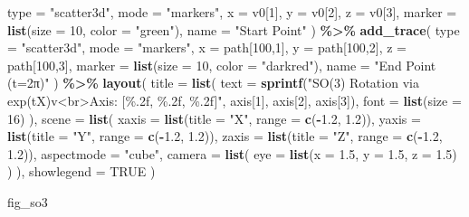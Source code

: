 \documentclass[
]{book}
\newenvironment{Shaded}{\begin{snugshade}}{\end{snugshade}}
\newcommand{\AttributeTok}[1]{\textcolor[rgb]{0.13,0.29,0.53}{#1}}
\newcommand{\ConstantTok}[1]{\textcolor[rgb]{0.56,0.35,0.01}{#1}}
\newcommand{\DecValTok}[1]{\textcolor[rgb]{0.00,0.00,0.81}{#1}}
\newcommand{\FloatTok}[1]{\textcolor[rgb]{0.00,0.00,0.81}{#1}}
\newcommand{\FunctionTok}[1]{\textcolor[rgb]{0.13,0.29,0.53}{\textbf{#1}}}
\newcommand{\NormalTok}[1]{#1}
\newcommand{\SpecialCharTok}[1]{\textcolor[rgb]{0.81,0.36,0.00}{\textbf{#1}}}
\newcommand{\StringTok}[1]{\textcolor[rgb]{0.31,0.60,0.02}{#1}}
\theoremstyle{definition}
\theoremstyle{definition}
\theoremstyle{definition}
\theoremstyle{definition}
\theoremstyle{remark}
\begin{document}
\begin{Shaded}
\begin{Highlighting}[]
    \AttributeTok{type =} \StringTok{"scatter3d"}\NormalTok{,}
    \AttributeTok{mode =} \StringTok{"markers"}\NormalTok{,}
    \AttributeTok{x =}\NormalTok{ v0[}\DecValTok{1}\NormalTok{], }\AttributeTok{y =}\NormalTok{ v0[}\DecValTok{2}\NormalTok{], }\AttributeTok{z =}\NormalTok{ v0[}\DecValTok{3}\NormalTok{],}
    \AttributeTok{marker =} \FunctionTok{list}\NormalTok{(}\AttributeTok{size =} \DecValTok{10}\NormalTok{, }\AttributeTok{color =} \StringTok{"green"}\NormalTok{),}
    \AttributeTok{name =} \StringTok{"Start Point"}
\NormalTok{  ) }\SpecialCharTok{\%\textgreater{}\%}
  \FunctionTok{add\_trace}\NormalTok{(}
    \AttributeTok{type =} \StringTok{"scatter3d"}\NormalTok{,}
    \AttributeTok{mode =} \StringTok{"markers"}\NormalTok{,}
    \AttributeTok{x =}\NormalTok{ path[}\DecValTok{100}\NormalTok{,}\DecValTok{1}\NormalTok{], }\AttributeTok{y =}\NormalTok{ path[}\DecValTok{100}\NormalTok{,}\DecValTok{2}\NormalTok{], }\AttributeTok{z =}\NormalTok{ path[}\DecValTok{100}\NormalTok{,}\DecValTok{3}\NormalTok{],}
    \AttributeTok{marker =} \FunctionTok{list}\NormalTok{(}\AttributeTok{size =} \DecValTok{10}\NormalTok{, }\AttributeTok{color =} \StringTok{"darkred"}\NormalTok{),}
    \AttributeTok{name =} \StringTok{"End Point (t=2π)"}
\NormalTok{  ) }\SpecialCharTok{\%\textgreater{}\%}
  \FunctionTok{layout}\NormalTok{(}
    \AttributeTok{title =} \FunctionTok{list}\NormalTok{(}
      \AttributeTok{text =} \FunctionTok{sprintf}\NormalTok{(}\StringTok{"SO(3) Rotation via exp(tX)v\textless{}br\textgreater{}Axis: [\%.2f, \%.2f, \%.2f]"}\NormalTok{, }
\NormalTok{                     axis[}\DecValTok{1}\NormalTok{], axis[}\DecValTok{2}\NormalTok{], axis[}\DecValTok{3}\NormalTok{]),}
      \AttributeTok{font =} \FunctionTok{list}\NormalTok{(}\AttributeTok{size =} \DecValTok{16}\NormalTok{)}
\NormalTok{    ),}
    \AttributeTok{scene =} \FunctionTok{list}\NormalTok{(}
      \AttributeTok{xaxis =} \FunctionTok{list}\NormalTok{(}\AttributeTok{title =} \StringTok{"X"}\NormalTok{, }\AttributeTok{range =} \FunctionTok{c}\NormalTok{(}\SpecialCharTok{{-}}\FloatTok{1.2}\NormalTok{, }\FloatTok{1.2}\NormalTok{)),}
      \AttributeTok{yaxis =} \FunctionTok{list}\NormalTok{(}\AttributeTok{title =} \StringTok{"Y"}\NormalTok{, }\AttributeTok{range =} \FunctionTok{c}\NormalTok{(}\SpecialCharTok{{-}}\FloatTok{1.2}\NormalTok{, }\FloatTok{1.2}\NormalTok{)),}
      \AttributeTok{zaxis =} \FunctionTok{list}\NormalTok{(}\AttributeTok{title =} \StringTok{"Z"}\NormalTok{, }\AttributeTok{range =} \FunctionTok{c}\NormalTok{(}\SpecialCharTok{{-}}\FloatTok{1.2}\NormalTok{, }\FloatTok{1.2}\NormalTok{)),}
      \AttributeTok{aspectmode =} \StringTok{"cube"}\NormalTok{,}
      \AttributeTok{camera =} \FunctionTok{list}\NormalTok{(}
        \AttributeTok{eye =} \FunctionTok{list}\NormalTok{(}\AttributeTok{x =} \FloatTok{1.5}\NormalTok{, }\AttributeTok{y =} \FloatTok{1.5}\NormalTok{, }\AttributeTok{z =} \FloatTok{1.5}\NormalTok{)}
\NormalTok{      )}
\NormalTok{    ),}
    \AttributeTok{showlegend =} \ConstantTok{TRUE}
\NormalTok{  )}

\NormalTok{fig\_so3}
\end{Highlighting}
\end{Shaded}
\end{document}

